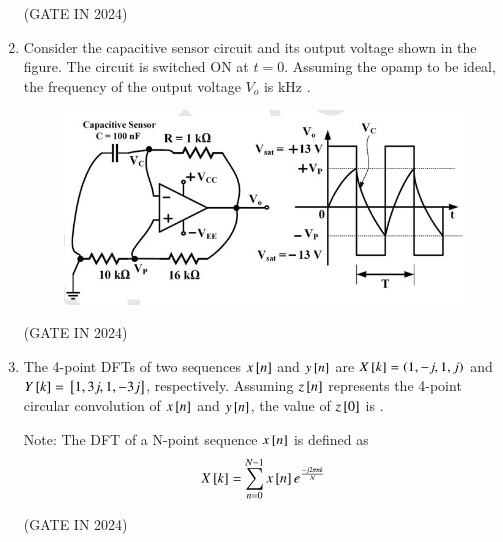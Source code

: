 \documentclass[journal,12pt,onecolumn]{IEEEtran}
\theoremstyle{remark}
\begin{document}
\begin{enumerate}
    \hfill{(GATE IN 2024)}
    
    \item Consider the capacitive sensor circuit and its output voltage shown in the figure.  The circuit is switched ON at $t = 0$. Assuming the opamp to be ideal, the frequency of the output voltage $V_o$ is \underline{\hspace{2cm}} kHz .
    \begin{figure}[H]
        \centering
        \includegraphics[width=0.9\columnwidth]{figs/p27.jpg}
        \caption*{}
        \label{fig:p27}
    \end{figure}
    
    \hfill{(GATE IN 2024)}
    
    \item The 4-point DFTs of two sequences $x{}\left[n\right]$ and $y{}\left[n\right]$ are $X{}\left[k\right] = \left(1, -j, 1, j\right)$ and $Y{}\left[k\right] = {}\left[1, 3j, 1, -3j\right]$, respectively. Assuming $z{}\left[n\right]$ represents the 4-point circular convolution of $x{}\left[n\right]$ and $y{}\left[n\right]$, the value of $z{}\left[0\right]$ is \underline{\hspace{2cm}} .
    
    Note: The DFT of a N-point sequence $x{}\left[n\right]$ is defined as
    \begin{align*}
        X{}\left[k\right] = \sum_{n=0}^{N-1} x{}\left[n\right] e^{\frac{-j2\pi nk}{N}}
    \end{align*}
    
    \hfill{(GATE IN 2024)}
    

\end{enumerate}
\end{document}
